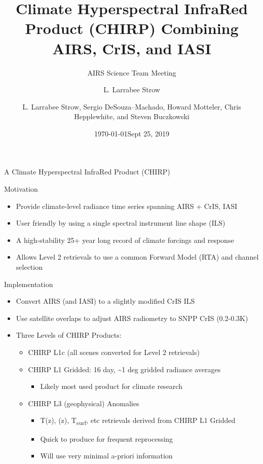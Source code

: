 \documentclass[10pt,t]{beamer}
\author{L. Larrabee Strow}
\date{\today}
\title{\large Climate Hyperspectral InfraRed Product (CHIRP) Combining AIRS, CrIS, and IASI}
\subtitle{\footnotesize{AIRS Science Team Meeting}}
\date{\vspace{0.1in}\footnotesize{Sept 25, 2019 \vfill}}
\author{L. Larrabee Strow\inst{1,2}, Sergio DeSouza--Machado\inst{1,2}, Howard Motteler\inst{2}, Chris Hepplewhite\inst{2}, and Steven Buczkowski\inst{2}}
\institute[UMBC]{\inst{1} UMBC Physics Dept. \and \inst{2}UMBC JCET}
\begin{document}
\maketitle
{}

\begin{frame}[label={sec:orgd91189d},shrink=20]{A Climate Hyperspectral InfraRed Product (CHIRP)}
\vspace{-0.1in}
\begin{block}{Motivation}
\begin{itemize}
\item Provide climate-level radiance time series spanning AIRS + CrIS, IASI
\item User friendly by using a single spectral instrument line shape (ILS)
\item A high-stability 25+ year long record of climate forcings and response
\item Allows Level 2 retrievals to use a common Forward Model (RTA) and channel selection
\end{itemize}
\end{block}

\begin{block}{Implementation}
\begin{itemize}
\item Convert AIRS (and IASI) to a slightly modified CrIS ILS
\item Use satellite overlaps to adjust AIRS radiometry to SNPP CrIS (0.2-0.3K)
\item Three Levels of CHIRP Products:
\begin{itemize}
\item CHIRP L1c (all scenes converted for Level 2 retrievals)
\item CHIRP L1 Gridded: 16 day, \textasciitilde{}1 deg gridded radiance averages
\begin{itemize}
\item Likely most used product for climate research
\end{itemize}
\item CHIRP L3 (geophysical) Anomalies
\begin{itemize}
\item T(z), \water(z), T\textsubscript{surf}, etc retrievals derived from CHIRP L1 Gridded
\item Quick to produce for frequent reprocessing
\item Will use very minimal a-priori information
\end{itemize}
\end{itemize}
\end{itemize}
\end{block}
\end{frame}
\end{document}
